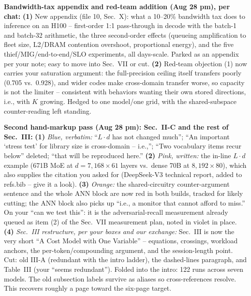 \documentclass[conference]{IEEEtran}
\begin{document}
{\begin{pnote}[aiviolet]
\textbf{Bandwidth-tax appendix and red-team addition (Aug 28 pm),
per chat:} {\bf (1)} New appendix (file 10, Sec.~X): what a 10--20\%
bandwidth tax does to inference on an H100 -- first-order 1:1
pass-through in decode with the batch-1 and batch-32 arithmetic,
the three second-order effects (queueing amplification to fleet
size, L2/DRAM contention overshoot, proportional energy), and the
five thief/MIG/end-to-end/SLO experiments, all days-scale. Parked as
an appendix per your note; easy to move into Sec.~VII or cut.
{\bf (2)} Red-team objection (1) now carries your saturation
argument: the full-precision ceiling itself transfers poorly (0.705
vs.\ 0.928), and wider codes make cross-domain transfer worse, so
capacity is not the limiter -- consistent with behaviors wanting
their own stored directions, i.e., with $K$ growing. Hedged to one
model/one grid, with the shared-subspace counter-reading left
standing.

\textbf{Second hand-markup pass (Aug 28 pm): Sec.~II-C and the rest
of Sec.~III:}
{\bf (1)} \emph{Blue, verbatim:} ``$L\!\cdot\!d$ has not changed
much''; ``An important `stress test' for library size is cross-domain
-- i.e.,''; ``Two vocabulary items recur below'' deleted; ``that will
be reproduced here.''
{\bf (2)} \emph{Pink, written:} the in-line $L\!\cdot\!d$ example
(671B MoE at $d{=}7{,}168\times61$ layers vs.\ dense 70B at
$8{,}192\times80$), which also supplies the citation you asked for
(DeepSeek-V3 technical report, added to refs.bib -- give it a look).
{\bf (3)} \emph{Orange:} the shared-circuitry counter-argument
sentence and the whole ANN block are now red in both builds, tracked
for likely cutting; the ANN block also picks up ``i.e., a monitor
that cannot afford to miss.'' On your ``can we test this'': it is the
adversarial-recall measurement already queued as item (2) of the
Sec.~VII measurement plan, noted in violet in place.
{\bf (4)} \emph{Sec.~III restructure, per your boxes and our
exchange:} Sec.~III is now the very short ``A Cost Model with One
Variable'' -- equations, crossings, workload anchors, the
per-token/compounding argument, and the session-length point. Cut:
old III-A (redundant with the intro ladder), the dashed-lines
paragraph, and Table~III (your ``seems redundant''). Folded into the
intro: 122 runs across seven models. The old subsection labels
survive as aliases so cross-references resolve. This recovers roughly
a page toward the six-page target.


\end{pnote}}
\end{document}
